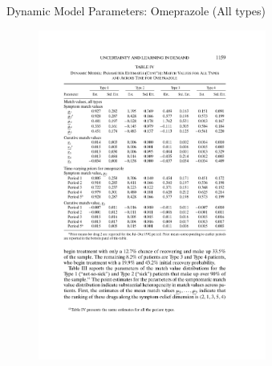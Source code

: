 \documentclass[xcolor=pdftex,dvipsnames,table,mathserif]{beamer}
\begin{document}
\begin{frame}{Dynamic Model Parameters: Omeprazole (All types)}
\begin{figure}[htbp]
\begin{center}
\includegraphics[width=7.5cm]{resources/crawfordshumparam2.pdf}
\label{default}
\end{center}
\end{figure}
\end{frame}
\end{document}
